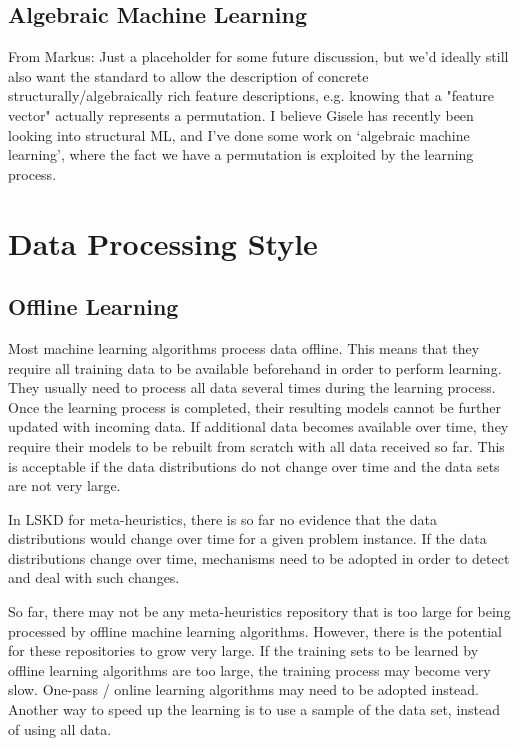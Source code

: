 \documentclass{article}
\begin{document}
\subsection{Algebraic Machine Learning}

From Markus: Just a placeholder for some future discussion, but we'd ideally still
also want the standard to allow the description of concrete
structurally/algebraically rich feature descriptions, e.g. knowing
that a "feature vector" actually represents a permutation. I believe
Gisele has recently been looking into structural ML, and I've done some
work on `algebraic machine learning', where the fact we have a
permutation is exploited by the learning process. 



\section{Data Processing Style}
\label{sec:learning-types}

\subsection{Offline Learning}

Most machine learning algorithms process data offline. This means  that they require all training data to be available beforehand in order to perform learning. They usually need to process all data several times during the learning process. Once the learning process is completed, their resulting models cannot be further updated with incoming data. If additional data becomes available over time, they require their models to be rebuilt from scratch with all data received so far. This is acceptable if the  data distributions do not change over time and the data sets are not very large. 

In LSKD for meta-heuristics, there is so far no evidence that the data distributions would change over time for a given problem instance. If the data distributions change over time, mechanisms need to be adopted in order to detect and deal with such changes. 

So far, there may not be any meta-heuristics repository that is too large for being processed by offline machine learning algorithms. However, there is the potential for these repositories to grow very large. If the training sets to be learned by offline learning algorithms are too large, the training process may become very slow. One-pass / online learning algorithms may need to be adopted instead. Another way to speed up the learning is to use a sample of the data set, instead of using all data.
\end{document}
